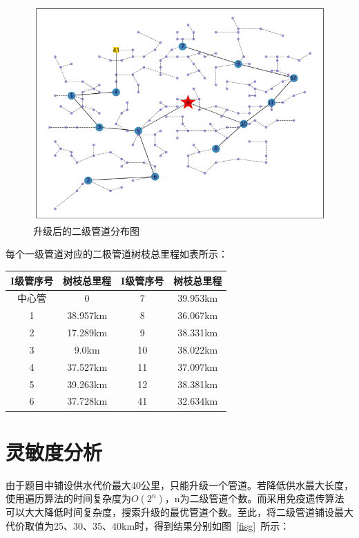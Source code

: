 \documentclass{whutmod}
\begin{document}
  	\begin{figure}[H]
  		\centering
  		\includegraphics[width=.7\textwidth]{figures/ssss.png}
  		\caption{升级后的二级管道分布图}\label{glsssd}
  	\end{figure}
  
  每个一级管道对应的二极管道树枝总里程如表所示：
  			\begin{table}[H]
  		\centering
  		\begin{tabular}{cccc}
  			\toprule[1.5pt]
  			\multicolumn{1}{m{3cm}}{\centering I级管序号} & \multicolumn{1}{m{3cm}}{\centering 树枝总里程} &
  			\multicolumn{1}{m{3cm}}{\centering I级管序号} &
  			\multicolumn{1}{m{3cm}}{\centering 树枝总里程} \\
  			\midrule[0.5pt]		
  			中心管 & 0 &7&39.953km \\ 
  			1  & 38.957km &8& 36.067km\\ 
  			2  & 17.289km &9& 38.331km\\ 
  		  	3  & 9.0km &10& 38.022km\\ 
  		  	4 & 37.527km &11&37.097km \\ 
  		  	5  & 39.263km &12& 38.381km\\ 
  		  	6  & 37.728km &41& 32.634km\\ 
  			\bottomrule[1.5pt]
  		\end{tabular}
  	\end{table}
  	
  	\section{灵敏度分析}
 	由于题目中铺设供水代价最大40公里，只能升级一个管道。若降低供水最大长度，使用遍历算法的时间复杂度为$O(2^n)$，n为二级管道个数。而采用免疫遗传算法可以大大降低时间复杂度，搜索升级的最优管道个数。至此，将二级管道铺设最大代价取值为25、30、35、40km时，得到结果分别如图~\ref{fisg}~所示：
 	
\end{document}
